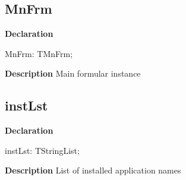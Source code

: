 \documentclass{report}
\newif\ifpdf
\begin{document}
\subsection*{MnFrm}
\fi
\label{manager-MnFrm}
\begin{list}{}{
\setlength{\itemindent}{0cm}
\setlength{\listparindent}{0cm}
\setlength{\leftmargin}{\evensidemargin}
\addtolength{\leftmargin}{\tmplength}
\settowidth{\labelsep}{X}
\addtolength{\leftmargin}{\labelsep}
\setlength{\labelwidth}{\tmplength}
}
\item[\textbf{Declaration}\hfill]
\ifpdf
\begin{flushleft}
\fi
\begin{ttfamily}
MnFrm:   TMnFrm;\end{ttfamily}

\ifpdf
\end{flushleft}
\fi

\par
\item[\textbf{Description}]
Main formular instance

\end{list}
\ifpdf
\subsection*{\large{\textbf{instLst}}\normalsize\hspace{1ex}\hrulefill}
\else
\subsection*{instLst}
\fi
\label{manager-instLst}
\begin{list}{}{
\setlength{\itemindent}{0cm}
\setlength{\listparindent}{0cm}
\setlength{\leftmargin}{\evensidemargin}
\addtolength{\leftmargin}{\tmplength}
\settowidth{\labelsep}{X}
\addtolength{\leftmargin}{\labelsep}
\setlength{\labelwidth}{\tmplength}
}
\item[\textbf{Declaration}\hfill]
\ifpdf
\begin{flushleft}
\fi
\begin{ttfamily}
instLst: TStringList;\end{ttfamily}

\ifpdf
\end{flushleft}
\fi

\par
\item[\textbf{Description}]
List of installed application names

\end{list}
\ifpdf
\end{document}
